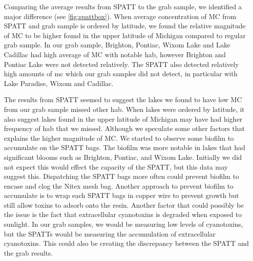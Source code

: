 Comparing the average results from SPATT to the grab sample, we identified a major difference (see \ref{fig:spattbox}). When average concentration of MC from SPATT and grab sample is ordered by latitude, we found the relative magnitude of MC to be higher found in the upper latitude of Michigan compared to regular grab sample. In our grab sample, Brighton, Pontiac, Wixom Lake and Lake Cadillac had high average of MC with notable \gls{hab}, however Brighton and Pontiac Lake were not detected relatively. The SPATT also detected relatively high amounts of \gls{mc} which our grab samples did not detect, in particular with Lake Paradise, Wixom and Cadillac. 

The results from SPATT seemed to suggest the lakes we found to have low MC from our grab sample missed other \gls{hab}. When lakes were ordered by latitude, it also suggest lakes found in the upper latitude of Michigan may have had higher frequency of \gls{hab} that we missed. Although we speculate some other factors that explains the higher magnitude of MC. We started to observe  some biofilm to accumulate on the SPATT bags. The biofilm was more notable in lakes that had significant blooms such as Brighton, Pontiac, and Wixom Lake. Initially we did not expect this would effect the capacity of the SPATT, but this data may suggest this. Dispatching the SPATT bags more often could prevent biofilm to encase and clog the Nitex mesh bag. Another approach to prevent biofilm to accumulate is to wrap each SPATT bags in copper wire to prevent growth but still allow toxins to adsorb onto the resin. Another factor that could possibly be the issue is the fact that extracellular cyanotoxins is degraded when exposed to sunlight. In our grab samples, we would be measuring low levels of cyanotoxins, but the SPATTs would be measuring the accumulation of extracellular cyanotoxins. This could also be creating the discrepancy between the SPATT and the grab results. 



